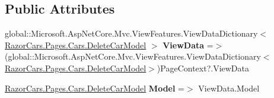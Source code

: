 \subsection*{Public Attributes}
\begin{DoxyCompactItemize}
\item 
\mbox{\label{class_razor_cars_1_1_pages_1_1_cars_1_1_pages___cars___delete_car_abceafbf16b3883c5d2c0203087b84d4f}} 
global\+::\+Microsoft.\+Asp\+Net\+Core.\+Mvc.\+View\+Features.\+View\+Data\+Dictionary$<$ \mbox{\hyperlink{class_razor_cars_1_1_pages_1_1_cars_1_1_delete_car_model}{Razor\+Cars.\+Pages.\+Cars.\+Delete\+Car\+Model}} $>$ {\bfseries View\+Data} =$>$ (global\+::\+Microsoft.\+Asp\+Net\+Core.\+Mvc.\+View\+Features.\+View\+Data\+Dictionary$<$\mbox{\hyperlink{class_razor_cars_1_1_pages_1_1_cars_1_1_delete_car_model}{Razor\+Cars.\+Pages.\+Cars.\+Delete\+Car\+Model}}$>$)Page\+Context?.View\+Data
\item 
\mbox{\label{class_razor_cars_1_1_pages_1_1_cars_1_1_pages___cars___delete_car_afa8b3d1935af1d21ab97ac5613552d01}} 
\mbox{\hyperlink{class_razor_cars_1_1_pages_1_1_cars_1_1_delete_car_model}{Razor\+Cars.\+Pages.\+Cars.\+Delete\+Car\+Model}} {\bfseries Model} =$>$ View\+Data.\+Model
\end{DoxyCompactItemize}
